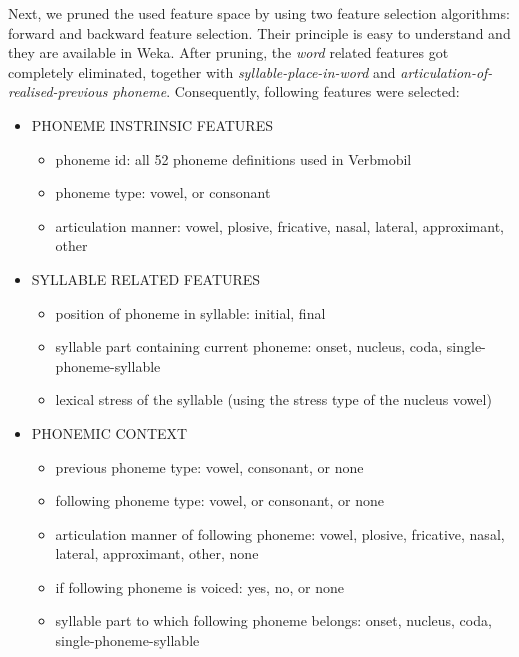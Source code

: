 \documentclass[11pt,a4paper]{scrbook}
\begin{document}
Next, we pruned the used feature space by using two feature selection algorithms: forward and backward feature selection. Their principle is easy to understand and they are available in Weka. After pruning, the \textit{word} related features got completely eliminated, together with \textit{syllable-place-in-word} and \textit{articulation-of-realised-previous phoneme}. Consequently, following features were selected:

\begin{itemize}
	\item PHONEME INSTRINSIC FEATURES

	\begin{itemize}
		\item phoneme id: all 52 phoneme definitions used in Verbmobil
		\item phoneme type: vowel, or consonant
		\item articulation manner: vowel, plosive, fricative, nasal, lateral, approximant, other
	\end{itemize}

	\item SYLLABLE RELATED FEATURES

	\begin{itemize}
		\item position of phoneme in syllable: initial, final
		\item syllable part containing current phoneme: onset, nucleus, coda, single-phoneme-syllable
		\item lexical stress of the syllable (using the stress type of the nucleus vowel)
	\end{itemize}

	\item PHONEMIC CONTEXT

	\begin{itemize}
		\item previous phoneme type: vowel, consonant, or none
		\item following phoneme type: vowel, or consonant, or none
		\item articulation manner of following phoneme: vowel, plosive, fricative, nasal, lateral, approximant, other, none
		\item if following phoneme is voiced: yes, no, or none
		\item syllable part to which following phoneme belongs: onset, nucleus, coda, single-phoneme-syllable
	\end{itemize}
\end{itemize}
\end{document}
